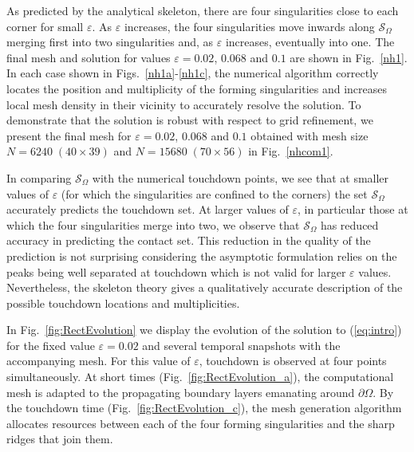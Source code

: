 \documentclass{siamart0516}
\renewcommand{\eqref}[1]{(\ref{#1})}
\newcommand{\eps}{\varepsilon}
\newcommand{\skel}{\mathcal{S}_{\Omega}}
\theoremstyle{plain}%
\theoremstyle{definition}
\theoremstyle{remark}
\begin{document}
%
 As predicted by the analytical skeleton, there are four singularities close to each corner for small $\eps$.
 As $\eps$ increases, the four singularities move inwards along $\skel$ merging first into two singularities and, as $\eps$ increases, eventually into one.
 The final mesh and solution for values $\eps = 0.02$, $0.068$ and $0.1$
 are shown in Fig.~\ref{nh1}. In each case shown in Figs.~\ref{nh1a}-\ref{nh1c}, the numerical algorithm correctly locates the position and multiplicity of the forming singularities and increases local mesh density in their vicinity to accurately resolve the solution. To demonstrate that the solution is robust with respect to grid refinement, we present the final mesh for $\eps = 0.02$, $0.068$ and $0.1$ obtained with mesh size $N = 6240\; (40 \times 39)$ and $N =15680\; (70 \times 56)$ in Fig.~\ref{nhcom1}.

In comparing $\skel$ with the numerical touchdown points, we see that at smaller values of $\eps$  (for which the singularities are confined to the corners) the set $\skel$ accurately predicts the touchdown set. At larger values of $\eps$, in particular those at which the four singularities merge into two, we observe that $\skel$ has reduced accuracy in predicting the contact set. This reduction in the quality of the prediction is not surprising considering the asymptotic formulation relies on the peaks being well separated at touchdown which is not valid for larger $\eps$ values. Nevertheless, the skeleton theory gives a qualitatively accurate description of the possible touchdown locations and multiplicities.

In Fig.~\ref{fig:RectEvolution} we display the evolution of the solution to \eqref{eq:intro} for the fixed value $\eps=0.02$ and several temporal snapshots with the accompanying mesh. For this value of $\eps$, touchdown is observed at four points simultaneously. At short times (Fig.~\ref{fig:RectEvolution_a}), the computational mesh is adapted to the propagating boundary layers emanating around $\partial\Omega$. By the touchdown time (Fig.~\ref{fig:RectEvolution_c}), the mesh generation algorithm allocates resources between each of the four forming singularities and the sharp ridges that join them.
\end{document}
